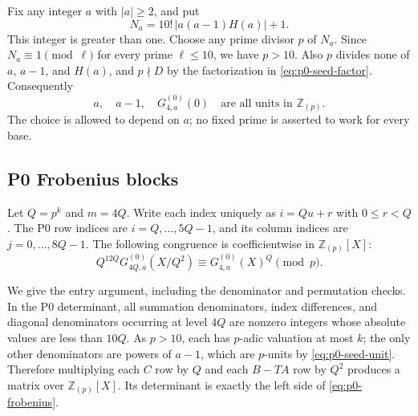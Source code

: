 Fix any integer $a$ with $|a|\ge2$, and put
\[
 N_a=10!\,|a(a-1)H(a)|+1.
\]
This integer is greater than one.  Choose any prime divisor $p$ of $N_a$.
Since $N_a\equiv1\pmod\ell$ for every prime $\ell\le10$, we have $p>10$.
Also $p$ divides none of $a$, $a-1$, and $H(a)$, and $p\nmid D$ by the
factorization in \eqref{eq:p0-seed-factor}.  Consequently
\begin{equation}\label{eq:p0-seed-unit}
 a,\quad a-1,\quad G^{(0)}_{4,a}(0)\quad\text{are all units in }\mathbb Z_{(p)}.
\end{equation}
The choice is allowed to depend on $a$; no fixed prime is asserted to work
for every base.

\subsection{P0 Frobenius blocks}

Let $Q=p^k$ and $m=4Q$.  Write each index uniquely as $i=Qu+r$ with
$0\le r<Q$.  The P0 row indices are $i=Q,\ldots,5Q-1$, and its column
indices are $j=0,\ldots,8Q-1$.  The following congruence is coefficientwise
in $\mathbb Z_{(p)}[X]$:
\begin{equation}\label{eq:p0-frobenius}
 Q^{12Q}G^{(0)}_{4Q,a}(X/Q^2)\equiv
 G^{(0)}_{4,a}(X)^Q\pmod p.
\end{equation}

We give the entry argument, including the denominator and permutation
checks.  In the P0 determinant, all summation denominators, index
 differences, and diagonal denominators occurring at level $4Q$ are nonzero
 integers whose absolute values are less than $10Q$.  As $p>10$, each has $p$-adic valuation at most
$k$; the only other denominators are powers of $a-1$, which are $p$-units by
\eqref{eq:p0-seed-unit}.  Therefore multiplying each $C$ row by $Q$ and
each $B-TA$ row by $Q^2$ produces a matrix over $\mathbb Z_{(p)}[X]$.
Its determinant is exactly the left side of \eqref{eq:p0-frobenius}.

